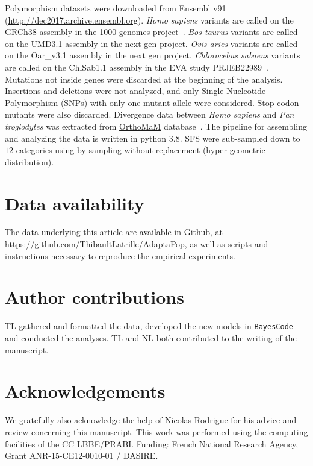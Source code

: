 \documentclass{article}
\begin{document}
Polymorphism datasets were downloaded from Ensembl v91 (\url{http://dec2017.archive.ensembl.org}).
\textit{Homo sapiens} variants are called on the GRCh38 assembly in the 1000 genomes project~\citep{consortium_integrated_2012, the_1000_genomes_project_consortium_global_2015}.
\textit{Bos taurus} variants are called on the UMD3.1 assembly in the next gen project.
\textit{Ovis aries} variants are called on the Oar\_v3.1 assembly in the next gen project.
\textit{Chlorocebus sabaeus} variants are called on the ChlSab1.1 assembly in the EVA study PRJEB22989~\citep{svardal_ancient_2017}.
Mutations not inside genes were discarded at the beginning of the analysis.
Insertions and deletions were not analyzed, and only Single Nucleotide Polymorphism (SNPs) with only one mutant allele were considered.
Stop codon mutants were also discarded.
Divergence data between \textit{Homo sapiens} and \textit{Pan troglodytes} was extracted from \href{http://www.orthomam.univ-montp2.fr}{OrthoMaM} database~\citep{ranwez_orthomam_2007, douzery_orthomam_2014, scornavacca_orthomam_2019}.
The pipeline for assembling and analyzing the data is written in python 3.8.
SFS were sub-sampled down to $12$ categories using by sampling without replacement (hyper-geometric distribution).

\section{Data availability}
The data underlying this article are available in Github, at \url{https://github.com/ThibaultLatrille/AdaptaPop}, as well as scripts and instructions necessary to reproduce the empirical experiments.

\section{Author contributions}
TL gathered and formatted the data, developed the new models in \texttt{BayesCode} and conducted the analyses.
TL and NL both contributed to the writing of the manuscript.

\section{Acknowledgements}
We gratefully also acknowledge the help of Nicolas Rodrigue for his advice and review concerning this manuscript.
This work was performed using the computing facilities of the CC LBBE/PRABI.
Funding: French National Research Agency, Grant ANR-15-CE12-0010-01 / DASIRE.



\end{document}
